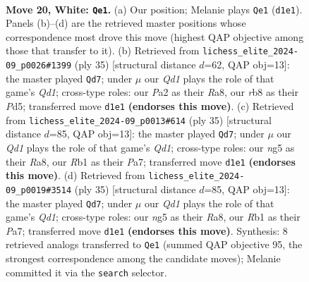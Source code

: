 \documentclass[11pt]{article}
\begin{document}
\begin{figure}[p]\centering
\begin{subfigure}{0.46\textwidth}\centering
\resizebox{\linewidth}{!}{%
\newchessgame
\chessboard[
  setfen={1r3qk1/p1pp1ppp/b7/6n1/1pNP4/1P6/P1P1BP1P/1R1Q2K1 w - - 2 20},
  showmover=false,
  pgfstyle=straightmove, color=movearrow, markmove={d1-e1}
]}
\caption{}
\end{subfigure}\hfill
\begin{subfigure}{0.46\textwidth}\centering
\resizebox{\linewidth}{!}{%
\newchessgame
\chessboard[
  setfen={r2q2k1/ppp2p1p/5bp1/3p1n2/P2P1B2/2P2N2/1P3PPP/R3Q1K1 b - - 1 18},
  showmover=false,
  pgfstyle=straightmove, color=movearrow, markmove={d8-d7}
]}
\caption{}
\end{subfigure}
\\[4pt]
\begin{subfigure}{0.46\textwidth}\centering
\resizebox{\linewidth}{!}{%
\newchessgame
\chessboard[
  setfen={r2q2k1/ppp2p1p/5bp1/3p1n2/3P1B2/2P2N2/PP1Q1PPP/R5K1 b - - 1 18},
  showmover=false,
  pgfstyle=straightmove, color=movearrow, markmove={d8-d7}
]}
\caption{}
\end{subfigure}\hfill
\begin{subfigure}{0.46\textwidth}\centering
\resizebox{\linewidth}{!}{%
\newchessgame
\chessboard[
  setfen={r2q2k1/ppp2p1p/5bp1/3p1n2/3P1B2/2P2N2/PP1Q1PPP/R5K1 b - - 1 18},
  showmover=false,
  pgfstyle=straightmove, color=movearrow, markmove={d8-d7}
]}
\caption{}
\end{subfigure}
\caption{\textbf{Move 20, White: \texttt{Qe1}.} (a) Our position; Melanie plays \texttt{Qe1} (\texttt{d1e1}). Panels (b)--(d) are the retrieved master positions whose correspondence most drove this move (highest QAP objective among those that transfer to it). (b) Retrieved from \texttt{lichess\_elite\_2024-09\_p0026\#1399} (ply 35) [structural distance $d$=62, QAP obj=13]: the master played \texttt{Qd7}; under $\mu$ our \emph{Qd1} plays the role of that game's \emph{Qd1}; cross-type roles: our \emph{P}a2 as their \emph{R}a8, our \emph{r}b8 as their \emph{P}d5; transferred move \texttt{d1e1} \textbf{(endorses this move)}. (c) Retrieved from \texttt{lichess\_elite\_2024-09\_p0013\#614} (ply 35) [structural distance $d$=85, QAP obj=13]: the master played \texttt{Qd7}; under $\mu$ our \emph{Qd1} plays the role of that game's \emph{Qd1}; cross-type roles: our \emph{n}g5 as their \emph{R}a8, our \emph{R}b1 as their \emph{P}a7; transferred move \texttt{d1e1} \textbf{(endorses this move)}. (d) Retrieved from \texttt{lichess\_elite\_2024-09\_p0019\#3514} (ply 35) [structural distance $d$=85, QAP obj=13]: the master played \texttt{Qd7}; under $\mu$ our \emph{Qd1} plays the role of that game's \emph{Qd1}; cross-type roles: our \emph{n}g5 as their \emph{R}a8, our \emph{R}b1 as their \emph{P}a7; transferred move \texttt{d1e1} \textbf{(endorses this move)}. Synthesis: 8 retrieved analogs transferred to \texttt{Qe1} (summed QAP objective 95, the strongest correspondence among the candidate moves); Melanie committed it via the \texttt{search} selector.}
\label{fig:thought-m38}
\end{figure}
\end{document}
